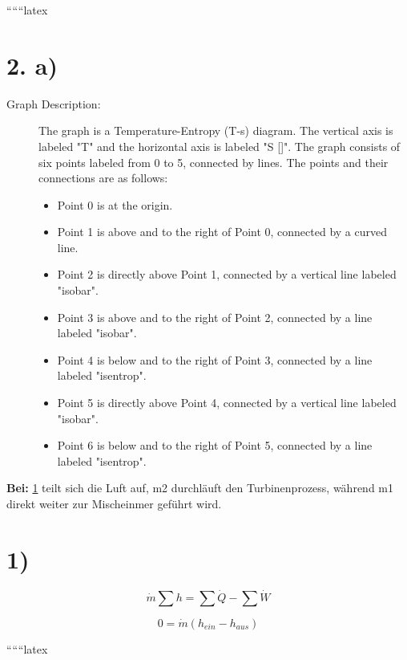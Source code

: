 
``````latex


\section*{2. a)}

\begin{description}
    \item[Graph Description:] The graph is a Temperature-Entropy (T-s) diagram. The vertical axis is labeled "T" and the horizontal axis is labeled "S []". The graph consists of six points labeled from 0 to 5, connected by lines. The points and their connections are as follows:
    \begin{itemize}
        \item Point 0 is at the origin.
        \item Point 1 is above and to the right of Point 0, connected by a curved line.
        \item Point 2 is directly above Point 1, connected by a vertical line labeled "isobar".
        \item Point 3 is above and to the right of Point 2, connected by a line labeled "isobar".
        \item Point 4 is below and to the right of Point 3, connected by a line labeled "isentrop".
        \item Point 5 is directly above Point 4, connected by a vertical line labeled "isobar".
        \item Point 6 is below and to the right of Point 5, connected by a line labeled "isentrop".
    \end{itemize}
\end{description}

\noindent
\textbf{Bei:} \underline{1} teilt sich die Luft auf, m2 durchläuft den Turbinenprozess, während m1 direkt weiter zur Mischeinmer geführt wird.

\section*{1)}

\[
\dot{m} \sum h = \sum \dot{Q} - \sum \dot{W}
\]

\[
0 = \dot{m} (h_{ein} - h_{aus})
\]

``````latex


